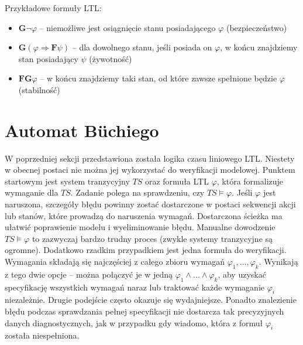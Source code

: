 Przykładowe formuły LTL:
\begin{itemize}
\item $\mathbf{G}\neg\varphi$ -- niemożliwe jest osiągnięcie stanu posiadającego $\varphi$ (bezpieczeństwo)
\item $\mathbf{G}(\varphi\Rightarrow\mathbf{F}\psi)$ -- dla dowolnego stanu, jeśli posiada on $\varphi$, w końcu znajdziemy stan posiadający $\psi$ (żywotność)
\item $\mathbf{FG}\varphi$ -- w końcu znajdziemy taki stan, od które zawsze spełnione będzie $\varphi$ (stabilność)
\end{itemize}


\section{Automat Büchiego}

W poprzedniej sekcji przedstawiona została logika czasu liniowego LTL.
Niestety w obecnej postaci nie można jej wykorzystać do weryfikacji modelowej.
Punktem startowym jest system tranzycyjny $TS$ oraz formuła LTL $\varphi$, która formalizuje wymaganie dla $TS$.
Zadanie polega na sprawdzeniu, czy $TS \models \varphi$.
Jeśli $\varphi$ jest naruszona, szczegóły błędu powinny zostać dostarczone w postaci sekwencji akcji lub stanów, które prowadzą do naruszenia wymagań. Dostarczona ścieżka ma ułatwić poprawienie modelu i wyeliminowanie błędu.
Manualne dowodzenie $TS \models \varphi$ to zazwyczaj bardzo trudny proces (zwykle systemy tranzycyjne są ogromne).
Dodatkowo rzadkim przypadkiem jest jedna formuła do weryfikacji.
Wymagania składają się najczęściej z całego zbioru wymagań $\varphi_1,...,\varphi_k$.
Wynikają z tego dwie opcje -- można połączyć je w jedną $\varphi_1 \land ... \land \varphi_k$, aby uzyskać specyfikację wszystkich wymagań naraz lub traktować każde wymaganie $\varphi_i$ niezależnie.
Drugie podejście często okazuje się wydajniejsze.
Ponadto znalezienie błędu podczas sprawdzania pełnej specyfikacji nie dostarcza tak precyzyjnych danych diagnostycznych, jak w przypadku gdy wiadomo, która z formuł $\varphi_i$ została niespełniona.

